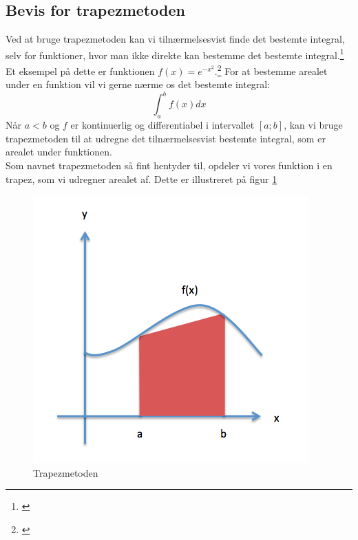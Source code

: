 \documentclass[12pt]{article}
\numberwithin{equation}{section}
\begin{document}
\subsection{Bevis for trapezmetoden}
Ved at bruge trapezmetoden kan vi tilnærmelsesvist finde det bestemte integral, selv for funktioner, hvor man ikke direkte kan bestemme det bestemte integral.\footnote{\cite[s. 13]{2012matA}} Et eksempel på dette er funktionen $f(x)=e^{-x^{2}}$.\footnote{\cite[s. 12]{2012matA}}
For at bestemme arealet under en funktion vil vi gerne nærme os det bestemte integral:
\begin{equation}
\int_{a}^{b}f(x)dx \nonumber
\end{equation}
Når $a<b$ og $f$ er kontinuerlig og differentiabel i intervallet $[a;b]$, kan vi bruge trapezmetoden til at udregne det tilnærmelsesvist bestemte integral, som er arealet under funktionen.\\
Som navnet trapezmetoden så fint hentyder til, opdeler vi vores funktion i en trapez, som vi udregner arealet af. Dette er illustreret på figur \ref{fig:trapezmetoden}
\begin{figure}[H]
\centering
\includegraphics[scale=0.5]{Billeder/trapezmetoden.png}
\caption{Trapezmetoden}
\label{fig:trapezmetoden}
\end{figure}
\end{document}
